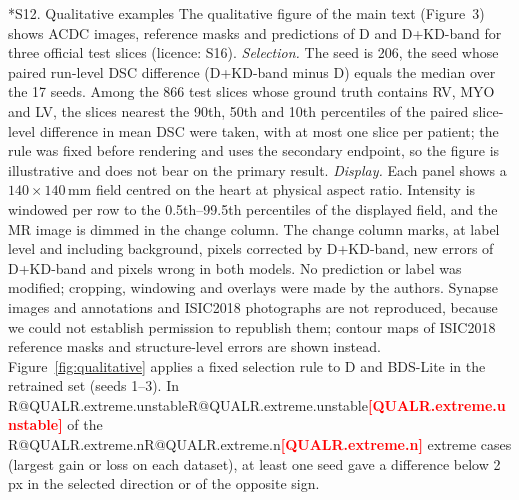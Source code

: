 \documentclass[10pt]{article}
\makeatletter
\newcommand{\R}[1]{\ifcsname R@#1\endcsname\csname R@#1\endcsname\else\textbf{\textcolor{red}{[#1]}}\fi}
\renewcommand\section{\@startsection{section}{1}{\z@}{-2.4ex \@plus -1ex \@minus -.2ex}{1.2ex \@plus .2ex}{\normalfont\large\bfseries}}
\makeatother
\begin{document}
\section*{S12. Qualitative examples}
The qualitative figure of the main text (Figure~3) shows ACDC images, reference masks and predictions of D and D+KD-band for three official test slices (licence: S16). \emph{Selection.} The seed is 206, the seed whose paired run-level DSC difference (D+KD-band minus D) equals the median over the 17 seeds. Among the 866 test slices whose ground truth contains RV, MYO and LV, the slices nearest the 90th, 50th and 10th percentiles of the paired slice-level difference in mean DSC were taken, with at most one slice per patient; the rule was fixed before rendering and uses the secondary endpoint, so the figure is illustrative and does not bear on the primary result. \emph{Display.} Each panel shows a $140\times140$\,mm field centred on the heart at physical aspect ratio. Intensity is windowed per row to the 0.5th--99.5th percentiles of the displayed field, and the MR image is dimmed in the change column. The change column marks, at label level and including background, pixels corrected by D+KD-band, new errors of D+KD-band and pixels wrong in both models. No prediction or label was modified; cropping, windowing and overlays were made by the authors. Synapse images and annotations and ISIC2018 photographs are not reproduced, because we could not establish permission to republish them; contour maps of ISIC2018 reference masks and structure-level errors are shown instead. Figure~\ref{fig:qualitative} applies a fixed selection rule to D and BDS-Lite in the retrained set (seeds 1--3). In \R{QUALR.extreme.unstable} of the \R{QUALR.extreme.n} extreme cases (largest gain or loss on each dataset), at least one seed gave a difference below 2\,px in the selected direction or of the opposite sign.
\end{document}
